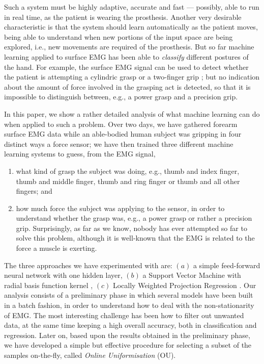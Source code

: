Such a system must be highly adaptive, accurate and fast --- possibly,
able to run in real time, as the patient is wearing the prosthesis.
Another very desirable characteristic is that the system should learn
automatically as the patient moves, being able to understand when new
portions of the input space are being explored, i.e., new movements
are required of the prosthesis. But so far machine learning applied to
surface EMG has been able to \emph{classify} different postures of the
hand. For example, the surface EMG signal can be used to detect
whether the patient is attempting a cylindric grasp or a two-finger
grip \cite{ekvall}; but no indication about the amount of force
involved in the grasping act is detected, so that it is impossible to
distinguish between, e.g., a power grasp and a precision grip.

In this paper, we show a rather detailed analysis of what machine
learning can do when applied to such a problem. Over two days, we have
gathered forearm surface EMG data while an able-bodied human subject
was gripping in four distinct ways a force sensor; we have then
trained three different machine learning systems to guess, from the
EMG signal,

\begin{enumerate}

  \item what kind of grasp the subject was doing, e.g., thumb and
    index finger, thumb and middle finger, thumb and ring finger or
    thumb and all other fingers; and

  \item how much force the subject was applying to the sensor, in
    order to understand whether the grasp was, e.g., a power grasp or
    rather a precision grip. Surprisingly, as far as we know, nobody
    has ever attempted so far to solve this problem, although it is
    well-known that the EMG is related to the force a muscle is
    exerting.

\end{enumerate}

The three approaches we have experimented with are:
$(a)$ a simple feed-forward neural network with one hidden layer,
$(b)$ a Support Vector Machine with radial basis function kernel
\cite{BGV92}, $(c)$ Locally Weighted Projection Regression
\cite{lwpr}. Our analysis consists of a preliminary phase in which
several models have been built in a batch fashion, in order to
understand how to deal with the non-stationarity of EMG. The most
interesting challenge has been how to filter out unwanted data, at the
same time keeping a high overall accuracy, both in classification and
regression. Later on, based upon the results obtained in the
preliminary phase, we have developed a simple but effective procedure
for selecting a subset of the samples on-the-fly, called \emph{Online
Uniformisation} (OU).


